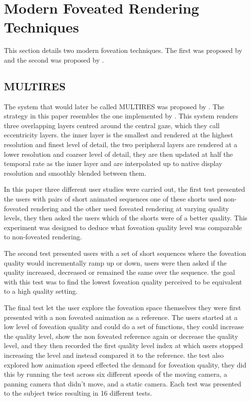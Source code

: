 \section{Modern Foveated Rendering Techniques}
This section details two modern foveation techniques. The first was proposed by \cite{Guenter:2012:FG:2366145.2366183} and the second was proposed by \cite{Vaidyanathan:2014:CPS:2980009.2980011}.

\subsection{MULTIRES}
The system that would later be called MULTIRES was proposed by \cite{Guenter:2012:FG:2366145.2366183}. The strategy in this paper resembles the one implemented by \cite{Levoy}. This system renders three overlapping layers centred around the central gaze, which they call eccentricity layers. the inner layer is the smallest and rendered at the highest resolution and finest level of detail, the two peripheral layers are rendered at a lower resolution and coarser level of detail, they are then updated at half the temporal rate as the inner layer and are interpolated up to native display resolution and smoothly blended between them. 

In this paper three different user studies were carried out, the first test presented the users with pairs of short animated sequences one of these shorts used non-foveated rendering and the other used foveated rendering at varying quality levels, they then asked the users which of the shorts were of a better quality. This experiment was designed to deduce what foveation quality level was comparable to non-foveated rendering.

The second test presented users with a set of short sequences where the foveation quality would incrementally ramp up or down, users were then asked if the quality increased, decreased or remained the same over the sequence. the goal with this test was to find the lowest foveation quality perceived to be equivalent to a high quality setting.

The final test let the user explore the foveation space themselves they were first presented with a non foveated animation as a reference. The users started at a low level of foveation quality and could do a set of functions, they could increase the quality level, show the non foveated reference again or decrease the quality level, and they then recorded the first quality level index at which users stopped increasing the level and instead compared it to the reference. the test also explored how animation speed effected the demand for foveation quality, they did this by running the test across six different speeds of the moving camera, a panning camera that didn’t move, and a static camera. Each test was presented to the subject twice resulting in 16 different tests.

